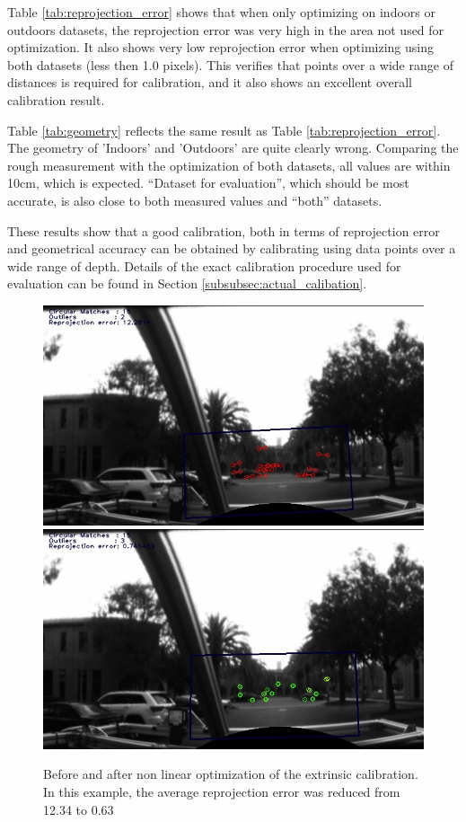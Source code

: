 Table \ref{tab:reprojection_error} shows that when only optimizing on indoors or outdoors datasets, the reprojection error was very high in the area not used for optimization.  It also shows very low reprojection error when optimizing using both datasets (less then 1.0 pixels).  This verifies that points over a wide range of distances is required for calibration, and it also shows an excellent overall calibration result.

Table \ref{tab:geometry} reflects the same result as Table \ref{tab:reprojection_error}.  The geometry of 'Indoors' and 'Outdoors' are quite clearly wrong.  Comparing the rough measurement with the optimization of both datasets, all values are within 10cm, which is expected.  ``Dataset for evaluation'', which should be most accurate, is also close to both measured values and ``both'' datasets.

These results show that a good calibration, both in terms of reprojection error and geometrical accuracy can be obtained by calibrating using data points over a wide range of depth. Details of the exact calibration procedure used for evaluation can be found in Section \ref{subsubsec:actual_calibation}.

\begin{figure}[h!]
  \centering
    \includegraphics[width=1.0\textwidth]{chapters/images/verify_before_opt}
    \includegraphics[width=1.0\textwidth]{chapters/images/verify_after_opt}
  \caption{Before and after non linear optimization of the extrinsic calibration.  In this example, the average reprojection error was reduced from 12.34 to 0.63}
  \label{fig:before_after_g2o}
\end{figure}